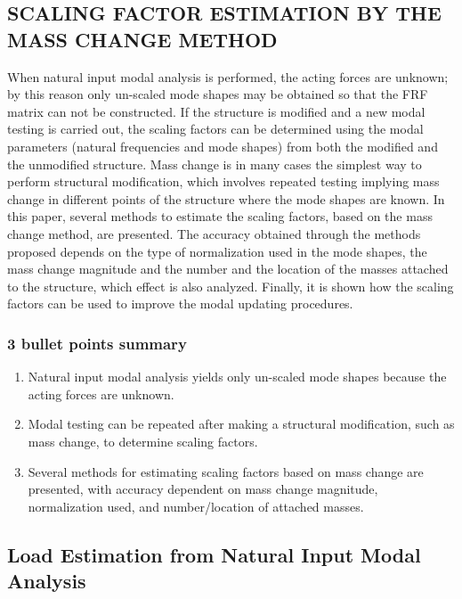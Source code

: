 \documentclass[
  letterpaper,
  DIV=11,
  numbers=noendperiod]{scrreprt}
\providecommand{\tightlist}{%
  \setlength{\itemsep}{0pt}\setlength{\parskip}{0pt}}\usepackage{longtable,booktabs,array}
\begin{document}
\hypertarget{scaling-factor-estimation-by-the-mass-change-method}{%
\subsection{SCALING FACTOR ESTIMATION BY THE MASS CHANGE
METHOD}\label{scaling-factor-estimation-by-the-mass-change-method}}

When natural input modal analysis is performed, the acting forces are
unknown; by this reason only un-scaled mode shapes may be obtained so
that the FRF matrix can not be constructed. If the structure is modified
and a new modal testing is carried out, the scaling factors can be
determined using the modal parameters (natural frequencies and mode
shapes) from both the modified and the unmodified structure. Mass change
is in many cases the simplest way to perform structural modification,
which involves repeated testing implying mass change in different points
of the structure where the mode shapes are known. In this paper, several
methods to estimate the scaling factors, based on the mass change
method, are presented. The accuracy obtained through the methods
proposed depends on the type of normalization used in the mode shapes,
the mass change magnitude and the number and the location of the masses
attached to the structure, which effect is also analyzed. Finally, it is
shown how the scaling factors can be used to improve the modal updating
procedures.

\hypertarget{bullet-points-summary-12}{%
\subsubsection{3 bullet points summary}\label{bullet-points-summary-12}}

\begin{enumerate}
\def\labelenumi{\arabic{enumi}.}
\tightlist
\item
  Natural input modal analysis yields only un-scaled mode shapes because
  the acting forces are unknown.
\item
  Modal testing can be repeated after making a structural modification,
  such as mass change, to determine scaling factors.
\item
  Several methods for estimating scaling factors based on mass change
  are presented, with accuracy dependent on mass change magnitude,
  normalization used, and number/location of attached masses.
\end{enumerate}

\hypertarget{load-estimation-from-natural-input-modal-analysis}{%
\subsection{Load Estimation from Natural Input Modal
Analysis}\label{load-estimation-from-natural-input-modal-analysis}}
\end{document}
